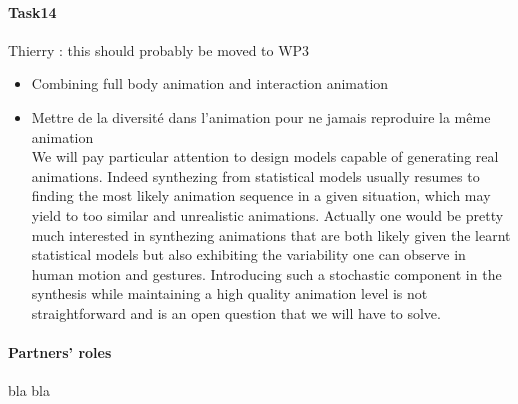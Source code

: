 \paragraph{Task14} Thierry : this should probably be moved to WP3\\
\begin{itemize}
  \item Combining full 	body animation and interaction animation
  \item Mettre de la diversité dans l'animation pour ne jamais reproduire la même animation\\
  
We will pay particular attention to design models capable of generating real animations. Indeed synthezing from statistical models usually resumes to finding the most likely animation sequence in a given situation, which may yield to too similar and unrealistic animations. Actually one would be pretty much interested in synthezing animations that are both likely given the learnt statistical models but also exhibiting the variability one can observe in human motion and gestures. Introducing such a stochastic component in the synthesis while maintaining a high quality animation level is not 
straightforward and is an open question that we will have to solve.
\end{itemize}

\paragraph{Partners' roles}

bla bla

\endinput